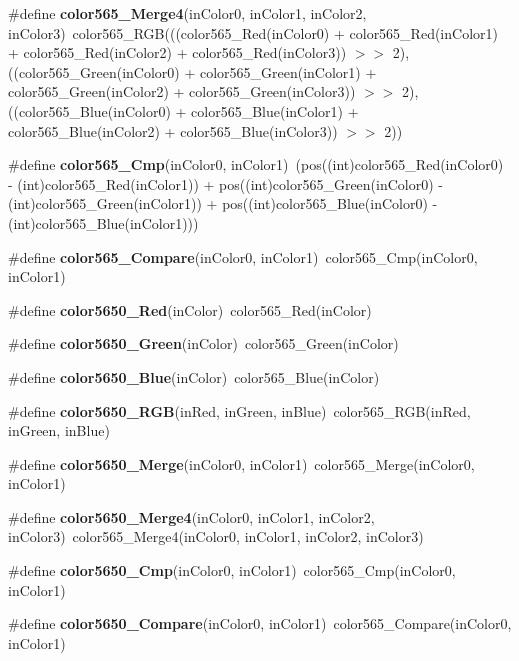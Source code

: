 \begin{CompactItemize}
\item 
\#define {\bf color565\_\-Merge4}(in\-Color0, in\-Color1, in\-Color2, in\-Color3)~color565\_\-RGB(((color565\_\-Red(in\-Color0) + color565\_\-Red(in\-Color1) + color565\_\-Red(in\-Color2) + color565\_\-Red(in\-Color3)) $>$$>$ 2), ((color565\_\-Green(in\-Color0) + color565\_\-Green(in\-Color1) + color565\_\-Green(in\-Color2) + color565\_\-Green(in\-Color3)) $>$$>$ 2), ((color565\_\-Blue(in\-Color0) + color565\_\-Blue(in\-Color1) + color565\_\-Blue(in\-Color2) + color565\_\-Blue(in\-Color3)) $>$$>$ 2))
\item 
\#define {\bf color565\_\-Cmp}(in\-Color0, in\-Color1)~(pos((int)color565\_\-Red(in\-Color0) - (int)color565\_\-Red(in\-Color1)) + pos((int)color565\_\-Green(in\-Color0) - (int)color565\_\-Green(in\-Color1)) + pos((int)color565\_\-Blue(in\-Color0) - (int)color565\_\-Blue(in\-Color1)))
\item 
\#define {\bf color565\_\-Compare}(in\-Color0, in\-Color1)~color565\_\-Cmp(in\-Color0, in\-Color1)
\item 
\#define {\bf color5650\_\-Red}(in\-Color)~color565\_\-Red(in\-Color)
\item 
\#define {\bf color5650\_\-Green}(in\-Color)~color565\_\-Green(in\-Color)
\item 
\#define {\bf color5650\_\-Blue}(in\-Color)~color565\_\-Blue(in\-Color)
\item 
\#define {\bf color5650\_\-RGB}(in\-Red, in\-Green, in\-Blue)~color565\_\-RGB(in\-Red, in\-Green, in\-Blue)
\item 
\#define {\bf color5650\_\-Merge}(in\-Color0, in\-Color1)~color565\_\-Merge(in\-Color0, in\-Color1)
\item 
\#define {\bf color5650\_\-Merge4}(in\-Color0, in\-Color1, in\-Color2, in\-Color3)~color565\_\-Merge4(in\-Color0, in\-Color1, in\-Color2, in\-Color3)
\item 
\#define {\bf color5650\_\-Cmp}(in\-Color0, in\-Color1)~color565\_\-Cmp(in\-Color0, in\-Color1)
\item 
\#define {\bf color5650\_\-Compare}(in\-Color0, in\-Color1)~color565\_\-Compare(in\-Color0, in\-Color1)
\end{CompactItemize}
